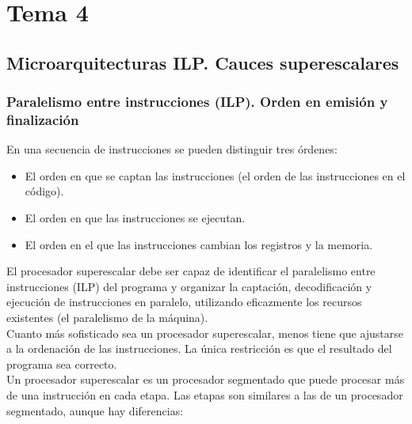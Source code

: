 \documentclass[12pt,spanish]{article}
\begin{document}
\section{Tema 4}


\subsection{Microarquitecturas ILP. Cauces superescalares}


\subsubsection{Paralelismo entre instrucciones (ILP). Orden en emisión y finalización}

En una secuencia de instrucciones se pueden distinguir tres órdenes:

\begin{itemize}
	\item El orden en que se captan las instrucciones (el orden de las instrucciones en el código).
	\item El orden en que las instrucciones se ejecutan.
	\item El orden en el que las instrucciones cambian los registros y la memoria.
\end{itemize}

El procesador superescalar debe ser capaz de identificar el paralelismo entre instrucciones (ILP) del programa y organizar la captación, decodificación y ejecución de instrucciones en paralelo, utilizando eficazmente los recursos existentes (el paralelismo de la máquina).\\

Cuanto más sofisticado sea un procesador superescalar, menos tiene que ajustarse a la ordenación de las instrucciones. La única restricción es que el resultado del programa sea correcto.\\

Un procesador superescalar es un procesador segmentado que puede procesar más de una instrucción en cada etapa. Las etapas son similares a las de un procesador segmentado, aunque hay diferencias:
\end{document}
